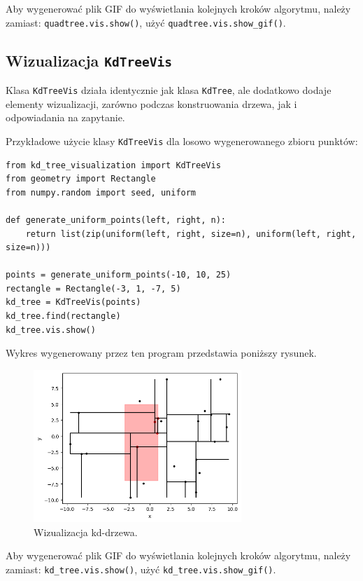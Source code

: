 \documentclass[12pt]{scrartcl}
\begin{document}
Aby wygenerować plik GIF do wyświetlania kolejnych kroków algorytmu, należy zamiast: \texttt{quadtree.vis.show()}, użyć \texttt{quadtree.vis.show\_gif()}.

\subsection{Wizualizacja \texttt{KdTreeVis}}
Klasa \texttt{KdTreeVis} działa identycznie jak klasa \texttt{KdTree}, ale dodatkowo dodaje elementy wizualizacji, zarówno podczas konstruowania drzewa, jak i odpowiadania na zapytanie.

Przykładowe użycie klasy \texttt{KdTreeVis} dla losowo wygenerowanego zbioru punktów:

\begin{verbatim}
from kd_tree_visualization import KdTreeVis
from geometry import Rectangle
from numpy.random import seed, uniform

def generate_uniform_points(left, right, n):
    return list(zip(uniform(left, right, size=n), uniform(left, right, size=n)))

points = generate_uniform_points(-10, 10, 25)
rectangle = Rectangle(-3, 1, -7, 5)
kd_tree = KdTreeVis(points)
kd_tree.find(rectangle)
kd_tree.vis.show()
\end{verbatim}

Wykres wygenerowany przez ten program przedstawia poniższy rysunek.

\begin{figure}[H]
    \centering
    \includegraphics[width=0.7\textwidth]{imgs/kd_tree_vis}
    \caption{Wizualizacja kd-drzewa.}
\end{figure}

Aby wygenerować plik GIF do wyświetlania kolejnych kroków algorytmu, należy zamiast:
\texttt{kd\_tree.vis.show()}, użyć \texttt{kd\_tree.vis.show\_gif()}.
\end{document}
